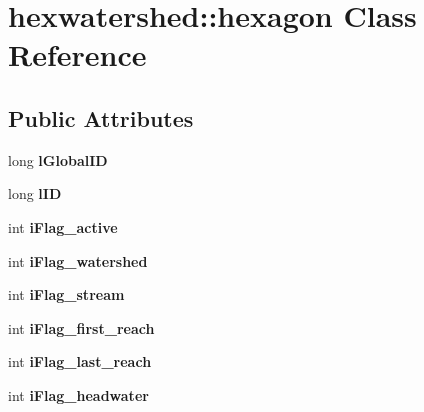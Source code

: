 \hypertarget{classhexwatershed_1_1hexagon}{\section{hexwatershed\-:\-:hexagon Class Reference}
\label{classhexwatershed_1_1hexagon}
}
\subsection*{Public Attributes}
\begin{DoxyCompactItemize}
\item 
\hypertarget{classhexwatershed_1_1hexagon_accf17b2b8de32d01b9bd0a06ba492a4e}{long {\bfseries l\-Global\-I\-D}}\label{classhexwatershed_1_1hexagon_accf17b2b8de32d01b9bd0a06ba492a4e}

\item 
\hypertarget{classhexwatershed_1_1hexagon_a9f4085d0184401658d991affe014ed0e}{long {\bfseries l\-I\-D}}\label{classhexwatershed_1_1hexagon_a9f4085d0184401658d991affe014ed0e}

\item 
\hypertarget{classhexwatershed_1_1hexagon_acbc3b3f0c16e635ce7d8c4c83456325b}{int {\bfseries i\-Flag\-\_\-active}}\label{classhexwatershed_1_1hexagon_acbc3b3f0c16e635ce7d8c4c83456325b}

\item 
\hypertarget{classhexwatershed_1_1hexagon_a28e0a8923873cbd8e196c2b902fa4730}{int {\bfseries i\-Flag\-\_\-watershed}}\label{classhexwatershed_1_1hexagon_a28e0a8923873cbd8e196c2b902fa4730}

\item 
\hypertarget{classhexwatershed_1_1hexagon_ad651b1f48c8e7369d3199a6a53c87061}{int {\bfseries i\-Flag\-\_\-stream}}\label{classhexwatershed_1_1hexagon_ad651b1f48c8e7369d3199a6a53c87061}

\item 
\hypertarget{classhexwatershed_1_1hexagon_ac1c5a756f508d9880d1b5bbd92517cf4}{int {\bfseries i\-Flag\-\_\-first\-\_\-reach}}\label{classhexwatershed_1_1hexagon_ac1c5a756f508d9880d1b5bbd92517cf4}

\item 
\hypertarget{classhexwatershed_1_1hexagon_a8358691197123bb90b2059ad85179e7a}{int {\bfseries i\-Flag\-\_\-last\-\_\-reach}}\label{classhexwatershed_1_1hexagon_a8358691197123bb90b2059ad85179e7a}

\item 
\hypertarget{classhexwatershed_1_1hexagon_a1a939fd274a91144584d445054f3ca0e}{int {\bfseries i\-Flag\-\_\-headwater}}\label{classhexwatershed_1_1hexagon_a1a939fd274a91144584d445054f3ca0e}


\end{DoxyCompactItemize}
